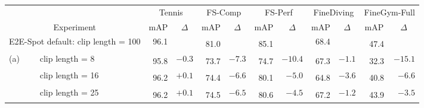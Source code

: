 \documentclass[runningheads]{llncs}
\newcommand{\notation}[1]{\ensuremath{#1}\xspace}
\newcommand{\OURMETHOD}{{E2E-Spot}\xspace}
\newcommand{\fscomp}{{FS-Comp}\xspace}
\newcommand{\fsperf}{{FS-Perf}\xspace}
\newcommand{\tennis}{{Tennis}\xspace}
\newcommand{\finegym}{{FineGym}\xspace}
\newcommand{\finediving}{{FineDiving}\xspace}
\newcommand{\FeatureExtractor}{\notation{F}}
\newcommand{\TemporalArchitecture}{\notation{G}}
\newcommand{\nms}{\textsuperscript{\textdagger}}
\begin{document}
\renewcommand{\tabcolsep}{0.105cm}
\begin{table*}[t]
    \caption{{\bf Ablation and analysis experiments (mAP @ $\delta=1$).}
We compare to \OURMETHOD defaults in the top row (RegNet-Y 200MF w/ GSM and GRU).
(a) Varying clip lengths show that temporal context from longer clips is generally helpful.
(b) Removing temporal information in the feature extractor $\FeatureExtractor$ (GSM) and in the stateful predictions $\TemporalArchitecture$ (GRU) generally reduces mAP.
(c) Reducing input resolution from 224 to 112 pixels reduces mAP.
(d) More complex models for $\TemporalArchitecture$ than the 1-layer GRU do not significantly improve mAP.
(e) Enlarging $\FeatureExtractor$ to 800MF and/or adding flow can improve mAP slightly on some datasets.}
    \label{tab:ablation_ourmethod}
    {
    \tiny
    \centering
    \begin{tabularx}{\textwidth}{ll rr rr rr rr rr}
        \toprule
        & & \multicolumn{2}{c}{\tennis}
            & \multicolumn{2}{c}{\fscomp}
            & \multicolumn{2}{c}{\fsperf}
            & \multicolumn{2}{c}{\finediving}
            & \multicolumn{2}{c}{\finegym-Full} \\
        \multicolumn{2}{c}{Experiment}
            & \multicolumn{1}{c}{mAP} & \multicolumn{1}{c}{$\Delta$}
            & \multicolumn{1}{c}{mAP} & \multicolumn{1}{c}{$\Delta$}
            & \multicolumn{1}{c}{mAP} & \multicolumn{1}{c}{$\Delta$}
            & \multicolumn{1}{c}{mAP} & \multicolumn{1}{c}{$\Delta$}
            & \multicolumn{1}{c}{mAP} & \multicolumn{1}{c}{$\Delta$} \\
        \midrule
        \multicolumn{2}{l}{\OURMETHOD default: clip length = 100}
            & 96.1 &
            & \nms 81.0 &
            & \nms 85.1 &
            & 68.4 &
            & \nms 47.4 & \\
        \midrule
        (a)
        & \tabindent clip length = 8
            & \nms 95.8 & $-0.3$
            & \nms 73.7 & $-7.3$
            & \nms 74.7 & $-10.4$
            & \nms 67.3 & $-1.1$
            & \nms 32.3 & $-15.1$ \\
        & \tabindent clip length = 16
            & \nms 96.2 & $+0.1$
            & \nms 74.4 & $-6.6$
            & \nms 80.1 & $-5.0$
            & \nms 64.8 & $-3.6$
            & \nms 40.8 & $-6.6$ \\
        & \tabindent clip length = 25
            & \nms 96.2 & $+0.1$
            & \nms 74.5 & $-6.5$
            & \nms 80.6 & $-4.5$
            & \nms 67.2 & $-1.2$
            & \nms 43.9 & $-3.5$ \\

\end{tabularx}}
\end{table*}
\end{document}
